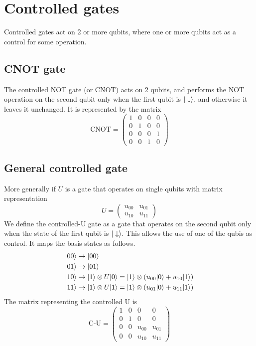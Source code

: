 \section{Controlled gates}
Controlled gates act on 2 or more qubits, where one or more qubits act as a control for some operation.
\subsection{CNOT gate}
The controlled NOT gate (or CNOT) acts on 2 qubits, and performs the NOT operation on the second qubit only when the first qubit is $|\downarrow\rangle$, and otherwise it leaves it unchanged. It is represented by the matrix
\begin{equation}
  \text{CNOT} = \left(\begin{array}{cccc}
  1 & 0 & 0 & 0 \\
  0 & 1 & 0 & 0 \\
  0 & 0 & 0 & 1 \\
  0 & 0 & 1 & 0
  \end{array}\right)
\end{equation}

\subsection{General controlled gate}
More generally if $U$ is a gate that operates on single qubits with matrix representation
\begin{equation}
  U = \left(\begin{array}{cc}
  u_{00} & u_{01} \\
  u_{10} & u_{11}
  \end{array}\right)
\end{equation}
We define the controlled-U gate as a gate that operates on the second qubit only when the state of the first qubit is $|\downarrow\rangle$. This allows the use of one of the qubis as control. It maps the basis states as follows.
\begin{equation}
  \begin{split}
    &|00\rangle\rightarrow|00\rangle\\
    &|01\rangle\rightarrow|01\rangle\\
    &|10\rangle\rightarrow|1\rangle\otimes U|0\rangle=|1\rangle\otimes \left(u_{00}|0\rangle+u_{10}|1\rangle\right)\\
    &|11\rangle\rightarrow|1\rangle\otimes U|1\rangle=|1\rangle\otimes \left(u_{01}|0\rangle+u_{11}|1\rangle\right)
  \end{split}
\end{equation}
The matrix representing the controlled U is
\begin{equation}
  \text{C-U} = \left(\begin{array}{cccc}
  1 & 0 & 0 & 0 \\
  0 & 1 & 0 & 0 \\
  0 & 0 & u_{00} & u_{01} \\
  0 & 0 & u_{10} & u_{11}
  \end{array}\right)
\end{equation}

